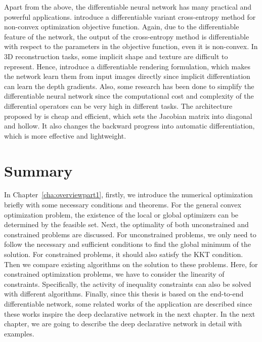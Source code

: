 \par Apart from the above, the differentiable neural network has many practical and powerful applications. \cite{AB:19} introduce a differentiable variant cross-entropy method for non-convex optimization objective function. Again, due to the differentiable feature of the network, the output of the cross-entropy method is differentiable with respect to the parameters in the objective function, even it is non-convex. In 3D reconstruction tasks, some implicit shape and texture are difficult to represent. Hence, \cite{NM:20} introduce a differentiable rendering formulation, which makes the network learn them from input images directly since implicit differentiation can learn the depth gradients. Also, some research has been done to simplify the differentiable neural network since the computational cost and complexity of the differential operators can be very high in different tasks. The architecture proposed by \cite{CR:19} is cheap and efficient, which sets the Jacobian matrix into diagonal and hollow. It also changes the backward progress into automatic differentiation, which is more effective and lightweight. 


\section{Summary}
\label{sec:2summary}
In Chapter~\ref{cha:overviewpart1}, firstly, we introduce the numerical optimization briefly with some necessary conditions and theorems. For the general convex optimization problem, the existence of the local or global optimizers can be determined by the feasible set. Next, the optimality of both unconstrained and constrained problems are discussed. For unconstrained problems, we only need to follow the necessary and sufficient conditions to find the global minimum of the solution. For constrained problems, it should also satisfy the KKT condition. Then we compare existing algorithms on the solution to these problems. Here, for constrained optimization problems, we have to consider the linearity of constraints. Specifically, the activity of inequality constraints can also be solved with different algorithms. Finally, since this thesis is based on the end-to-end differentiable network, some related works of the application are described since these works inspire the deep declarative network in the next chapter. In the next chapter, we are going to describe the deep declarative network in detail with examples. 




